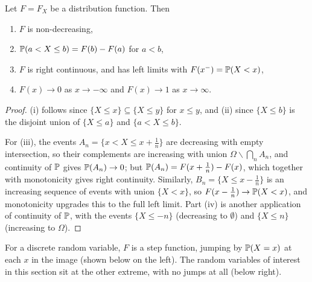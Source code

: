 \documentclass[a4paper]{scrartcl}
\begin{document}
\begin{proposition}
	Let $F = F_X$ be a distribution function. Then
	\begin{enumerate}[label=(\roman*)]
		\item $F$ is non-decreasing,
		\item $\mathbb{P}(a < X \leq b) = F(b) - F(a)$ for $a < b$,
		\item $F$ is right continuous, and has left limits with $F(x^-) = \mathbb{P}(X < x)$,
		\item $F(x) \rightarrow 0$ as $x \rightarrow -\infty$ and $F(x) \rightarrow 1$ as $x \rightarrow \infty$.
	\end{enumerate}
\end{proposition}
\begin{proof}
	(i) follows since $\{X \leq x\} \subseteq \{X \leq y\}$ for $x \leq y$, and (ii) since $\{X \leq b\}$ is the disjoint union of $\{X \leq a\}$ and $\{a < X \leq b\}$.

	For (iii), the events $A_n = \{x < X \leq x + \frac{1}{n}\}$ are decreasing with empty intersection, so their complements are increasing with union $\Omega \backslash \bigcap_n A_n$, and continuity of $\mathbb{P}$ gives $\mathbb{P}(A_n) \rightarrow 0$; but $\mathbb{P}(A_n) = F(x + \frac1n) - F(x)$, which together with monotonicity gives right continuity. Similarly, $B_n = \{X \leq x - \frac1n\}$ is an increasing sequence of events with union $\{X < x\}$, so $F(x - \frac1n) \rightarrow \mathbb{P}(X < x)$, and monotonicity upgrades this to the full left limit. Part (iv) is another application of continuity of $\mathbb{P}$, with the events $\{X \leq -n\}$ (decreasing to $\emptyset$) and $\{X \leq n\}$ (increasing to $\Omega$).
\end{proof}

For a discrete random variable, $F$ is a step function, jumping by $\mathbb{P}(X = x)$ at each $x$ in the image (shown below on the left). The random variables of interest in this section sit at the other extreme, with no jumps at all (below right).

\begin{center}
\qquad
{}
\end{center}
\end{document}

